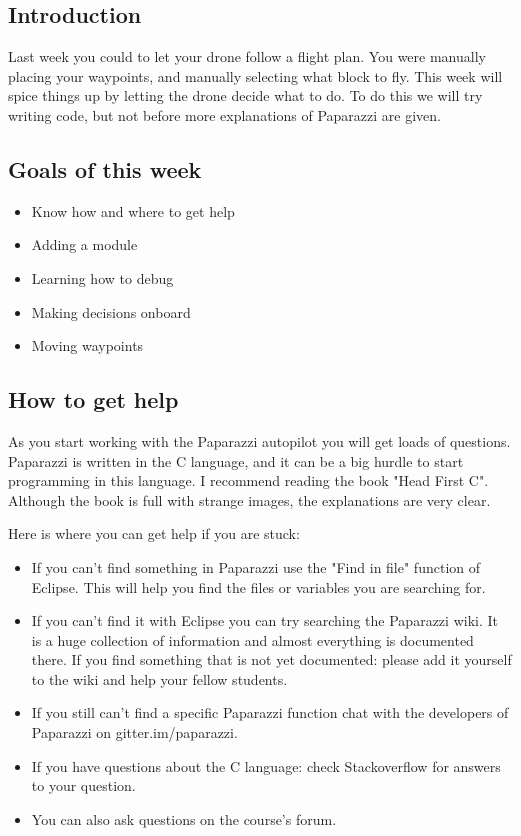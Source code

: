 \documentclass{article}
\begin{document}

\subsection*{Introduction}
Last week you could to let your drone follow a flight plan. You were manually placing your waypoints, and manually selecting what block to fly. This week will spice things up by letting the drone decide what to do. 
To do this we will try writing code, but not before more explanations of Paparazzi are given. 
\subsection*{Goals of this week}
\begin{itemize}
\item Know how and where to get help
\item Adding a module
\item Learning how to debug
\item Making decisions onboard
\item Moving waypoints
\end{itemize}
\subsection*{How to get help}
As you start working with the Paparazzi autopilot you will get loads of questions. Paparazzi is written in the C language, and it can be a big hurdle to start programming in this language. I recommend reading the book "Head First C". Although the book is full with strange images, the explanations are very clear. 

Here is where you can get help if you are stuck: 
\begin{itemize}
\item If you can't find something in Paparazzi use the "Find in file" function of Eclipse. This will help you find the files or variables you are searching for.
\item If you can't find it with Eclipse you can try searching the Paparazzi wiki. It is a huge collection of information and almost everything is documented there. If you find something that is not yet documented: please add it yourself to the wiki and help your fellow students. 
\item If you still can't find a specific Paparazzi function chat with the developers of Paparazzi on gitter.im/paparazzi.
\item If you have questions about the C language: check Stackoverflow for answers to your question.
\item You can also ask questions on the course's forum. 
\end{itemize}
\end{document}

